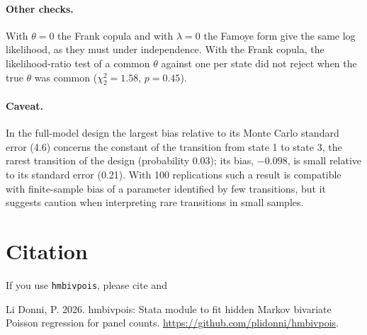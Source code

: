 \documentclass[11pt,a4paper]{article}
\newcommand{\cmd}[1]{\texttt{#1}}
\begin{document}
\paragraph{Other checks.} With $\theta=0$ the Frank copula and with $\lambda=0$ the Famoye form give the
same log likelihood, as they must under independence. With the Frank copula, the likelihood-ratio test
of a common $\theta$ against one per state did not reject when the true $\theta$ was common
($\chi^2_2=1.58$, $p=0.45$).

\paragraph{Caveat.} In the full-model design the largest bias relative to its Monte Carlo standard error
(4.6) concerns the constant of the transition from state 1 to state 3, the rarest transition of the
design (probability 0.03); its bias, $-0.098$, is small relative to its standard error (0.21). With
100 replications such a result is compatible with finite-sample bias of a parameter identified by few
transitions, but it suggests caution when interpreting rare transitions in small samples.

\section*{Citation}
If you use \cmd{hmbivpois}, please cite \citet{laudicella2022} and

\smallskip
\noindent Li Donni, P. 2026. hmbivpois: Stata module to fit hidden Markov bivariate Poisson regression for
panel counts. \url{https://github.com/plidonni/hmbivpois}.
\end{document}
